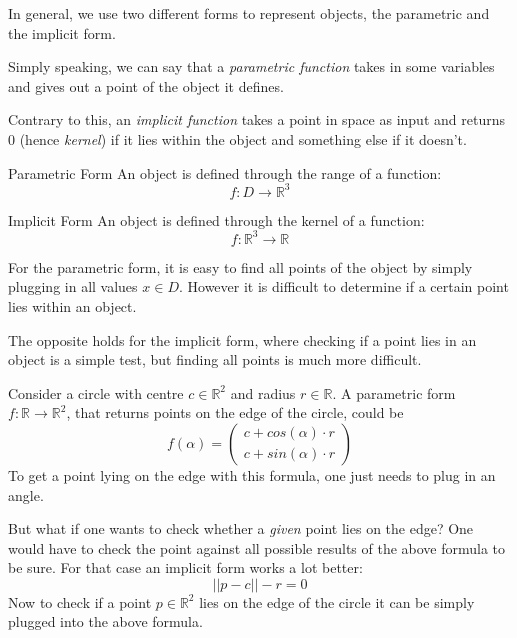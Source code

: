 \documentclass{panikzettel}
\begin{document}
\begin{halfboxl}
In general, we use two different forms to represent objects, the parametric and the implicit form.

Simply speaking, we can say that a \textit{parametric function} takes in some variables and gives out a point of the object it defines.

Contrary to this, an \textit{implicit function} takes a point in space as input and returns $0$ (hence \emph{kernel}) if it lies within the object and something else if it doesn't.
\end{halfboxl}%
\begin{halfboxr}
\vspace{-\baselineskip}
\begin{defi}{Parametric Form}
An object is defined through the range of a function: $$f : D \to \mathbb{R}^3 $$
\end{defi}

\begin{defi}{Implicit Form}
An object is defined through the kernel of a function: $$f: \mathbb{R}^3 \to \mathbb{R}$$
\end{defi}
\end{halfboxr}
For the parametric form, it is easy to find all points of the object by simply plugging in all values $x \in D$. However it is difficult to determine if a certain point lies within an object.

The opposite holds for the implicit form, where checking if a point lies in an object is a simple test, but finding all points is much more difficult.


Consider a circle with centre $c \in \mathbb{R}^2$ and radius $r \in \mathbb{R}$.
A parametric form $f: \mathbb{R} \to \mathbb{R}^2$, that returns points on the edge of the circle, could be
\[
    f(\alpha) = \begin{pmatrix} c + cos(\alpha) \cdot r \\ c + sin(\alpha) \cdot r \end{pmatrix}
\]
To get a point lying on the edge with this formula, one just needs to plug in an angle.

But what if one wants to check whether a \emph{given} point lies on the edge? One would have to check the point against all possible results of the above formula to be sure. For that case an implicit form works a lot better:
\[
    ||p - c|| - r = 0
\]
Now to check if a point $p \in \mathbb{R}^2$ lies on the edge of the circle it can be simply plugged into the above formula.
\end{document}
